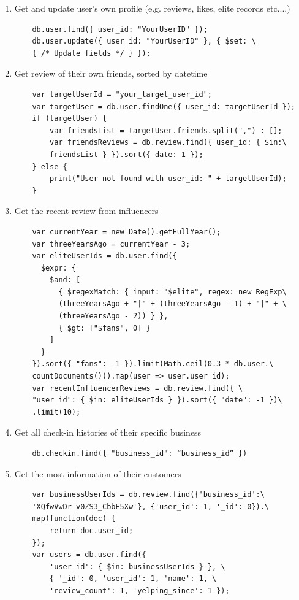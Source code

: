 \documentclass[runningheads]{llncs}
\begin{document}
\begin{enumerate}
\begin{verbatim}
    \end{verbatim}
    
    \item Get and update user's own profile (e.g. reviews, likes, elite records etc....)
    \begin{verbatim}
    db.user.find({ user_id: "YourUserID" });
    db.user.update({ user_id: "YourUserID" }, { $set: \
    { /* Update fields */ } }); 
    \end{verbatim}

    \item Get review of their own friends, sorted by datetime
    \begin{verbatim}
    var targetUserId = "your_target_user_id";
    var targetUser = db.user.findOne({ user_id: targetUserId });
    if (targetUser) {
        var friendsList = targetUser.friends.split(",") : [];
        var friendsReviews = db.review.find({ user_id: { $in:\
        friendsList } }).sort({ date: 1 });
    } else {
        print("User not found with user_id: " + targetUserId);
    }
    \end{verbatim}

    \item  Get the recent review from influencers 
    \begin{verbatim}
    var currentYear = new Date().getFullYear();
    var threeYearsAgo = currentYear - 3;
    var eliteUserIds = db.user.find({
      $expr: {
        $and: [
          { $regexMatch: { input: "$elite", regex: new RegExp\
          (threeYearsAgo + "|" + (threeYearsAgo - 1) + "|" + \
          (threeYearsAgo - 2)) } },
          { $gt: ["$fans", 0] }
        ]
      }
    }).sort({ "fans": -1 }).limit(Math.ceil(0.3 * db.user.\
    countDocuments())).map(user => user.user_id);
    var recentInfluencerReviews = db.review.find({ \
    "user_id": { $in: eliteUserIds } }).sort({ "date": -1 })\
    .limit(10);
    \end{verbatim}

    \item Get all check-in histories of their specific business
    \begin{verbatim}
    db.checkin.find({ "business_id": “business_id” })
    \end{verbatim}
    
        \item Get the most information of their customers 
        \begin{verbatim}
    var businessUserIds = db.review.find({'business_id':\
    'XQfwVwDr-v0ZS3_CbbE5Xw'}, {'user_id': 1, '_id': 0}).\
    map(function(doc) {
        return doc.user_id;
    });
    var users = db.user.find({
        'user_id': { $in: businessUserIds } }, \
        { '_id': 0, 'user_id': 1, 'name': 1, \
        'review_count': 1, 'yelping_since': 1 });
    \end{verbatim}
    

\end{enumerate}
\end{document}

